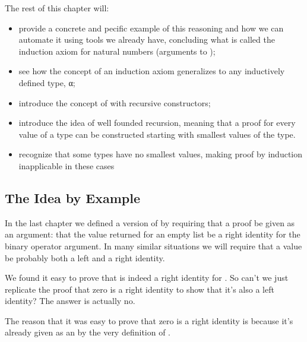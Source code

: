 \documentclass[letterpaper,10pt,english]{sphinxmanual}
\begin{document}
\sphinxAtStartPar
The rest of this chapter will:
\begin{itemize}
\item {} 
\sphinxAtStartPar
provide a concrete and pecific example of this reasoning and how we can automate it using tools we already have, concluding what is called the induction axiom for natural numbers (arguments to );

\item {} 
\sphinxAtStartPar
see how the concept of an induction axiom generalizes to any inductively defined type, α;

\item {} 
\sphinxAtStartPar
introduce the concept of  with recursive constructors;

\item {} 
\sphinxAtStartPar
introduce the idea of well founded recursion, meaning that a proof for every value of a type can be constructed starting with smallest values of the type.

\item {} 
\sphinxAtStartPar
recognize that some types have no smallest values, making proof by induction inapplicable in these cases

\end{itemize}


\subsection{The Idea by Example}
\label{\detokenize{A_03_Recursive_Types:the-idea-by-example}}
\sphinxAtStartPar
In the last chapter we defined a  version of 
by requiring that a proof be given as an argument: that the
value returned for an empty list be a right identity for the
binary operator argument. In many similar situations we will
require that a value be probably both a left and a right
identity.

\sphinxAtStartPar
We found it easy to prove that  is indeed a right
identity for . So can’t we just replicate the proof
that zero is a right identity to show that it’s also a left
identity? The answer is actually no.

\sphinxAtStartPar
The reason that it was easy to prove that zero is a right
identity is because it’s already given as an  by
the very definition of .
\end{document}
